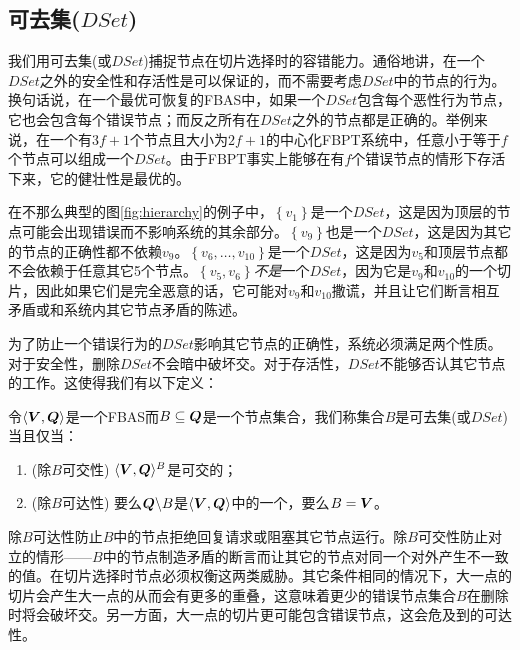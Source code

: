 \subsection{可去集($DSet$)}
我们用可去集(或$DSet$)捕捉节点在切片选择时的容错能力。通俗地讲，在一个$DSet$之外的安全性和存活性是可以保证的，而不需要考虑$DSet$中的节点的行为。换句话说，在一个最优可恢复的FBAS中，如果一个$DSet$包含每个恶性行为节点，它也会包含每个错误节点；而反之所有在$DSet$之外的节点都是正确的。举例来说，在一个有$3f+1$个节点且{\quorum}大小为$2f+1$的中心化FBPT系统中，任意小于等于$f$个节点可以组成一个$DSet$。由于FBPT事实上能够在有$f$个错误节点的情形下存活下来，它的健壮性是最优的。

在不那么典型的图\ref{fig:hierarchy}的例子中，$\left\{v_1\right\}$是一个$DSet$，这是因为顶层的节点可能会出现错误而不影响系统的其余部分。$\left\{v_9\right\}$也是一个$DSet$，这是因为其它的节点的正确性都不依赖$v_9$。$\left\{v_6,\ldots,v_{10}\right\}$是一个$DSet$，这是因为$v_5$和顶层节点都不会依赖于任意其它5个节点。$\left\{v_5,v_6\right\}$\textit{不是}一个$DSet$，因为它是$v_9$和$v_{10}$的一个切片，因此如果它们是完全恶意的话，它可能对$v_9$和$v_{10}$撒谎，并且让它们断言相互矛盾或和系统内其它节点矛盾的陈述。

为了防止一个错误行为的$DSet$影响其它节点的正确性，系统必须满足两个性质。对于安全性，删除$DSet$不会暗中破坏{\quorum}交。对于存活性，$DSet$不能够否认其它节点的工作{\quorum}。这使得我们有以下定义：

\begin{definition}[DSet]
        令$\langle{\bm V},{\bm Q}\rangle$是一个FBAS而$B\subseteq {\bm Q}$是一个节点集合，我们称集合$B$是可去集(或$DSet$)当且仅当：
        \begin{enumerate}
                \item (除$B${\quorum}可交性) $\langle{\bm V},{\bm Q}\rangle^{B}$是{\quorum}可交的；
                \item (除$B${\quorum}可达性) 要么${\bm Q}\backslash B$是$\langle{\bm V},{\bm Q}\rangle$中的一个{\quorum}，要么$B={\bm V}$。
        \end{enumerate}
\end{definition}

除$B${\quorum}可达性防止$B$中的节点拒绝回复请求或阻塞其它节点运行。除$B${\quorum}可交性防止对立的情形——$B$中的节点制造矛盾的断言而让其它的节点对同一个{\slot}对外产生不一致的值。在切片选择时节点必须权衡这两类威胁。其它条件相同的情况下，大一点的切片会产生大一点的{\quorum}从而会有更多的重叠，这意味着更少的错误节点集合$B$在删除时将会破坏{\quorum}交。另一方面，大一点的切片更可能包含错误节点，这会危及到{\quorum}的可达性。


